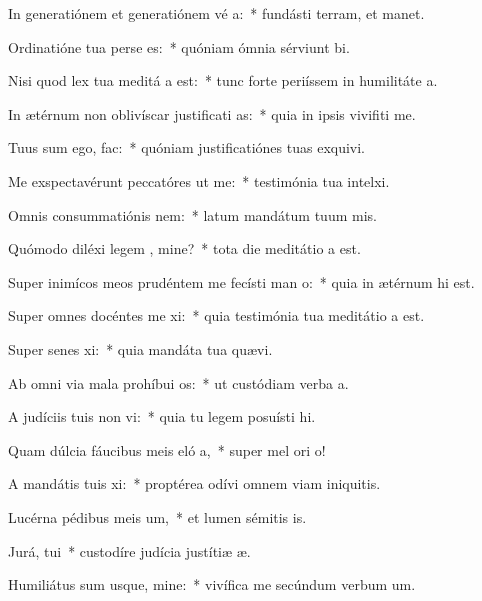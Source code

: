 \item In generatiónem et generatiónem vé a:~* fundásti terram, et manet.
\item Ordinatióne tua perse es:~* quóniam ómnia sérviunt bi.
\item Nisi quod lex tua meditá a est:~* tunc forte periíssem in humilitáte a.
\item In ætérnum non oblivíscar justificati as:~* quia in ipsis vivifiti me.
\item Tuus sum ego,   fac:~* quóniam justificatiónes tuas exquivi.
\item Me exspectavérunt peccatóres ut  me:~* testimónia tua intelxi.
\item Omnis consummatiónis  nem:~* latum mandátum tuum mis.
\item Quómodo diléxi legem , mine?~* tota die meditátio a est.
\item Super inimícos meos prudéntem me fecísti man o:~* quia in ætérnum hi est.
\item Super omnes docéntes me xi:~* quia testimónia tua meditátio a est.
\item Super senes xi:~* quia mandáta tua quævi.
\item Ab omni via mala prohíbui  os:~* ut custódiam verba a.
\item A judíciis tuis non vi:~* quia tu legem posuísti hi.
\item Quam dúlcia fáucibus meis eló a,~* super mel ori o!
\item A mandátis tuis xi:~* proptérea odívi omnem viam iniquitis.
\item Lucérna pédibus meis  um,~* et lumen sémitis is.
\item Jurá,  tui~* custodíre judícia justítiæ æ.
\item Humiliátus sum usque, mine:~* vivífica me secúndum verbum um.
